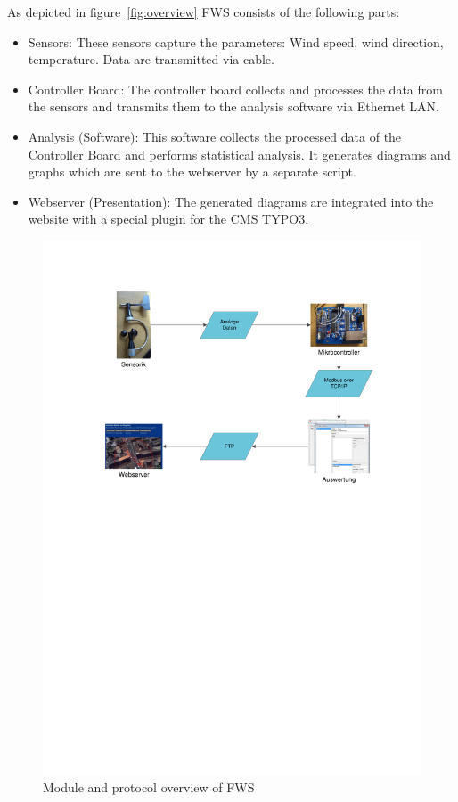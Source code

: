 As depicted in figure~\ref{fig:overview} FWS consists of the following parts:
\begin{itemize}
\item Sensors: These sensors capture the parameters: Wind speed, wind direction, temperature. Data are transmitted via cable.
\item Controller Board: The controller board collects and processes the data from the sensors and transmits them to the analysis software via Ethernet LAN.
\item Analysis (Software): This software collects the processed data of the Controller Board and performs statistical analysis. It generates diagrams and graphs which are sent to the webserver by a separate script.
\item Webserver (Presentation): The generated diagrams are integrated into the website with a special plugin for the CMS TYPO3.
\end{itemize}

\begin{figure}[ht]
    \centering
    \includegraphics[width=\linewidth]{graphics/overview.pdf}
    \caption{Module and protocol overview of FWS}
    \label{fig:fws_overview}
\end{figure}

